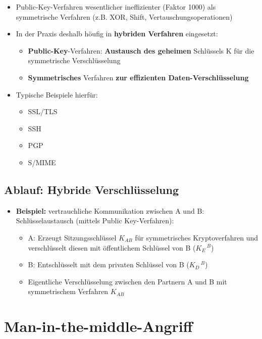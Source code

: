 \documentclass[openany]{book}
\begin{document}
\begin{itemize}
    \item Public-Key-Verfahren wesentlicher ineffizienter (Faktor 1000) als symmetrische Verfahren (z.B. XOR, Shift, Vertauschungsoperationen)
    \item In der Praxis deshalb höufig in \textbf{hybriden Verfahren} eingesetzt:
    \begin{itemize}
        \item \textbf{Public-Key}-Verfahren: \textbf{Austausch des geheimen} Schlüssels K für die symmetrische Verschlüsselung
        \item \textbf{Symmetrisches} Verfahren \textbf{zur effizienten Daten-Verschlüsselung}
    \end{itemize}
    \item Typische Beispiele hierfür:
    \begin{itemize}
        \item SSL/TLS
        \item SSH
        \item PGP
        \item S/MIME
    \end{itemize}
\end{itemize}

\subsection{Ablauf: Hybride Verschlüsselung}

\begin{itemize}
    \item \textbf{Beispiel:} vertrauchliche Kommunikation zwischen A und B: Schlüsselaustausch (mittels Public Key-Verfahren):
    \begin{itemize}
        \item A: Erzeugt Sitzungsschlüssel $K_{AB}$ für symmetrisches Kryptoverfahren und verschlüsselt diesen mit öffentlichem Schlüssel von B ($K_E\, ^B$)
        \item B: Entschlüsselt mit dem privaten Schlüssel von B ($K_D\, ^B$)
        \item Eigentliche Verschlüsselung zwischen den Partnern A und B mit symmetrischem Verfahren $K_{AB}$
    \end{itemize}
\end{itemize}

\section{Man-in-the-middle-Angriff}
\end{document}
